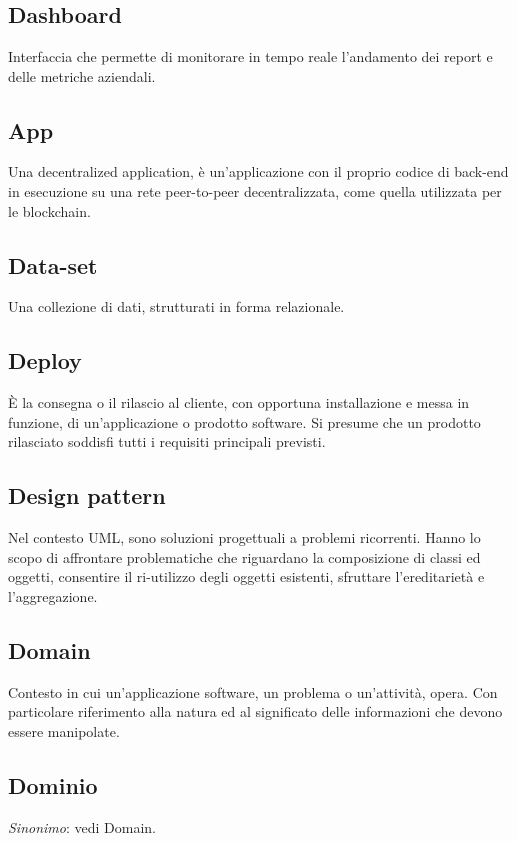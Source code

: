 \section[D]{}
	\subsection*{Dashboard}
	Interfaccia che permette di monitorare in tempo reale l’andamento dei report e delle metriche aziendali.
	\subsection*{\DJ{}App}
	Una decentralized application, è un’applicazione con il proprio codice di back-end in esecuzione su una rete peer-to-peer decentralizzata, come quella utilizzata per le blockchain.
	\subsection*{Data-set}
	Una collezione di dati, strutturati in forma relazionale.
	\subsection*{Deploy}
	È la consegna o il rilascio al cliente, con opportuna installazione e messa in funzione, di un’applicazione o prodotto software. Si presume che un prodotto rilasciato soddisfi tutti i requisiti principali previsti.
	\subsection*{Design pattern}
	Nel contesto UML, sono soluzioni progettuali a problemi ricorrenti. Hanno lo scopo di affrontare problematiche che riguardano la composizione di classi ed oggetti, consentire il ri-utilizzo degli oggetti esistenti, sfruttare l’ereditarietà e l’aggregazione.
	\subsection*{Domain}
	Contesto in cui un’applicazione software, un problema o un’attività, opera. Con particolare riferimento alla natura ed al significato delle informazioni che devono essere manipolate.
	\subsection*{Dominio}
	\emph{Sinonimo}: vedi Domain.
\pagebreak
